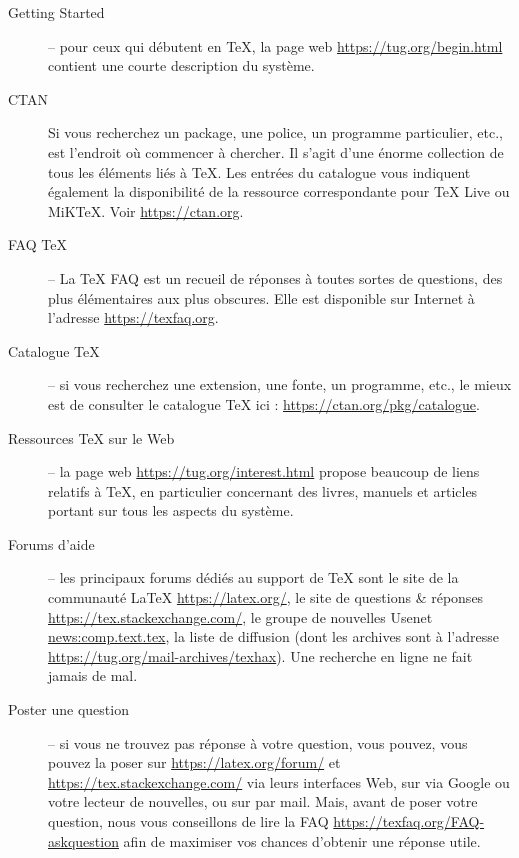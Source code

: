 \documentclass[german, english, french]{article}
\renewcommand{\TL}{\TeX{} Live\xspace}%
\begin{document}
\begin{description}
\item[Getting Started] -- pour ceux qui débutent en \TeX, la page web
  \url{https://tug.org/begin.html} contient une courte description du système.

\item [CTAN] Si vous recherchez un package, une police, un programme
  particulier, etc., \CTAN{} est l'endroit où commencer à chercher. Il s'agit
  d'une énorme collection de tous les éléments liés à \TeX{}. Les entrées du
  catalogue vous indiquent également la disponibilité de la ressource
  correspondante pour \TL{} ou MiK\TeX. Voir \url{https://ctan.org}.

\item [FAQ \TeX{}] -- La \TeX{} FAQ est un recueil de réponses à toutes sortes
  de questions, des plus élémentaires aux plus obscures. Elle est disponible sur
  Internet à l'adresse \url{https://texfaq.org}.

\item[Catalogue \TeX{}] -- si vous recherchez une extension, une fonte, un
  programme, etc., le mieux est de consulter le catalogue \TeX{} %
  ici : \url{https://ctan.org/pkg/catalogue}.

\item[Ressources \TeX{} sur le Web] -- la page web
  \url{https://tug.org/interest.html} propose beaucoup de liens relatifs
  à \TeX{}, en particulier concernant des livres, manuels et articles portant
  sur tous les aspects du système.

\item[Forums d'aide] -- les principaux forums dédiés au support de \TeX{} sont
  le site de la communauté \LaTeX{} \url{https://latex.org/}, le site de
  questions \& réponses \url{https://tex.stackexchange.com/}, le groupe de
  nouvelles Usenet \url{news:comp.text.tex}, la liste de diffusion
   (dont les archives sont à l'adresse
  \url{https://tug.org/mail-archives/texhax}).  Une recherche en ligne ne fait
  jamais de mal.

\item[Poster une question] -- si vous ne trouvez pas réponse à votre question,
  vous pouvez, vous pouvez la poser sur \url{https://latex.org/forum/} et
  \url{https://tex.stackexchange.com/} via leurs interfaces Web, sur
   via Google ou votre lecteur de nouvelles, ou sur
   par mail. Mais, avant de poser votre question, nous
  vous conseillons de lire la FAQ \url{https://texfaq.org/FAQ-askquestion} afin
  de maximiser vos chances d'obtenir une réponse utile.
\end{description}
\end{document}
